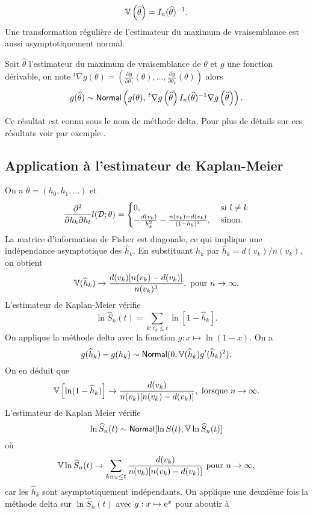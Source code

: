 $$
\mathbb{V}\left(\widehat{\theta}\right) = I_n(\widehat{\theta})^{-1}.
$$
Une transformation régulière de l'estimateur du maximum de vraisemblance est aussi asymptotiquement normal.
\begin{prop}
Soit $\widehat{\theta}$ l'estimateur du maximum de vraisemblance de $\theta$ et $g$ une fonction dérivable, on note $^t\nabla g(\theta) = \left(\frac{\partial g}{\partial \theta_1}(\theta),\ldots, \frac{\partial g}{\partial \theta_k}(\theta)\right)$   alors 
$$
g(\widehat{\theta})\sim\mathsf{Normal}\left(g(\theta), \,^t\nabla g\left(\widehat{\theta}\right)I_n(\widehat{\theta})^{-1}\nabla g\left(\widehat{\theta}\right)\right).
$$
\end{prop}
Ce résultat est connu sous le nom de méthode delta. Pour plus de détails sur ces résultats voir par exemple \cite[Chapitre 9]{Wasserman2013}.
\subsection{Application à l'estimateur de Kaplan-Meier}
On a $\theta= (h_0,h_1,\ldots)$ et
\begin{equation}\label{eq:partial_derivative_log_like}
\frac{\partial^2 }{\partial h_k\partial h_l} l(\mathcal{D};\theta)=\begin{cases}
0,&\text{ si }l\neq k\\
-\frac{d(v_k)}{h_k^2}-\frac{n(v_k)-d(v_k)}{(1-h_k)^2},&\text{ sinon.}
\end{cases}
\end{equation}
La matrice d'information de Fisher est diagonale, ce qui implique une indépendance asymptotique des $\widehat{h}_{k}$. En substituant $h_k$ par $\widehat{h}_k = d(v_k)/n(v_k)$, on obtient 
$$
\mathbb{V}(\widehat{h}_k)\rightarrow \frac{d(v_k)[n(v_k)-d(v_k)]}{n(v_k)^3},\text{ pour }n\rightarrow \infty.
$$
L'estimateur de Kaplan-Meier vérifie
$$
\ln\widehat{S}_n(t)=\sum_{k:v_k\leq t}\ln\left[1-\widehat{h}_k\right].
$$
On applique la méthode delta avec la fonction $g:x\mapsto \ln(1-x)$. On a 
$$
g(\widehat{h}_k) - g(h_k)\sim \mathsf{Normal}(0,\mathbb{V}(\widehat{h}_k)g'(\widehat{h}_k)^2
).
$$
On en déduit que 
$$
\mathbb{V}\left[\ln(1-\widehat{h}_k)\right]\rightarrow \frac{d(v_k)}{n(v_k)[n(v_k) - d(v_k)]},\text{ lorsque }n\rightarrow\infty.
$$
L'estimateur de Kaplan Meier vérifie
$$
\ln\widehat{S}_n(t)\sim\mathsf{Normal}[\ln S(t), \mathbb{V}\ln\widehat{S}_n(t)]
$$
où
$$
\mathbb{V}\ln\widehat{S}_n(t)\rightarrow \sum_{k:v_k\leq t}\frac{d(v_k)}{n(v_k)[n(v_k) - d(v_k)]}\text{ pour }n\rightarrow\infty,
$$
car les $\widehat{h}_k$ sont asymptotiquement indépendants. On applique une deuxième fois la méthode delta sur $\ln\widehat{S}_n(t)$ avec $g:x\mapsto \mathrm{e}^x$ pour aboutir à 
